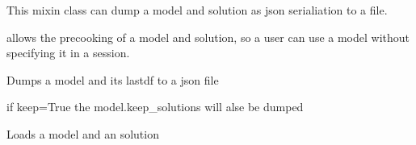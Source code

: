 \documentclass[letterpaper,10pt,english]{sphinxmanual}
\begin{document}
\begin{fulllineitems}
\label{\detokenize{index:modelclass.Json_Mixin}}
\pysigstartsignatures
{}
\pysigstopsignatures
\sphinxAtStartPar
This mixin class can dump a model and solution
as json serialiation to a file.

\sphinxAtStartPar
allows the precooking of a model and solution, so
a user can use a model without specifying it in
a session.

\begin{fulllineitems}
\label{\detokenize{index:modelclass.Json_Mixin.modeldump}}
\pysigstartsignatures
{}
\pysigstopsignatures
\sphinxAtStartPar
Dumps a model and its lastdf to a json file

\sphinxAtStartPar
if keep=True the model.keep\_solutions will alse be dumped

\end{fulllineitems}


\begin{fulllineitems}
\label{\detokenize{index:modelclass.Json_Mixin.modelload}}
\pysigstartsignatures
{}
\pysigstopsignatures
\sphinxAtStartPar
Loads a model and an solution

\end{fulllineitems}


\end{fulllineitems}

\end{document}
